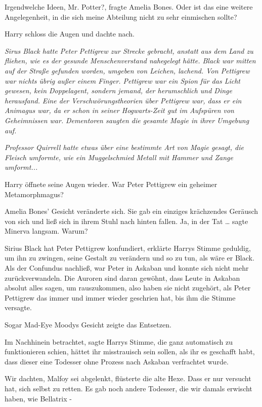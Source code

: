 \glqq{}Irgendwelche Ideen, Mr. Potter?\grqq{}, fragte Amelia Bones. \glqq{}Oder
ist das eine weitere Angelegenheit, in die sich meine Abteilung nicht zu sehr
einmischen sollte?\grqq{}

Harry schloss die Augen und dachte nach.

\emph{Sirus Black hatte Peter Pettigrew zur Strecke gebracht, anstatt aus dem
Land zu fliehen, wie es der gesunde Menschenverstand nahegelegt hätte. Black war
mitten auf der Straße gefunden worden, umgeben von Leichen, lachend. Von
Pettigrew war nichts übrig außer einem Finger. Pettigrew war ein Spion für das
Licht gewesen, kein Doppelagent, sondern jemand, der herumschlich und Dinge
herausfand.} \emph{ Eine der Verschwörungstheorien über Pettigrew war, dass er
ein Animagus war, da er schon in seiner Hogwarts-Zeit gut im Aufspüren von
Geheimnissen war.} \emph{ Dementoren saugten die gesamte Magie in ihrer Umgebung
auf.}

\emph{Professor Quirrell hatte etwas über eine bestimmte Art von Magie gesagt,
die Fleisch umformte, wie ein Muggelschmied Metall mit Hammer und Zange
umformt...}

Harry öffnete seine Augen wieder. \glqq{}War Peter Pettigrew ein geheimer
Metamorphmagus?\grqq{}

Amelia Bones' Gesicht veränderte sich. Sie gab ein einziges krächzendes Geräusch
von sich und ließ sich in ihrem Stuhl nach hinten fallen. \glqq{}Ja, in der Tat
…\grqq{} sagte Minerva langsam. \glqq{}Warum?\grqq{}

\glqq{}Sirius Black hat Peter Pettigrew konfundiert\grqq{}, erklärte Harrys
Stimme geduldig, \glqq{}um ihn zu zwingen, seine Gestalt zu verändern und so zu
tun, als wäre er Black. Als der Confundus nachließ, war Peter in Askaban und
konnte sich nicht mehr zurückverwandeln. Die Auroren sind daran gewöhnt, dass
Leute in Askaban absolut alles sagen, um rauszukommen, also haben sie nicht
zugehört, als Peter Pettigrew das immer und immer wieder geschrien hat, bis ihm
die Stimme versagte.\grqq{}

Sogar Mad-Eye Moodys Gesicht zeigte das Entsetzen.

\glqq{}Im Nachhinein betrachtet\grqq{}, sagte Harrys Stimme, die ganz automatisch
zu funktionieren schien, \glqq{}hättet ihr misstrauisch sein sollen, als ihr es
geschafft habt, dass dieser eine Todesser ohne Prozess nach Askaban verfrachtet
wurde.\grqq{}

\glqq{}Wir dachten, Malfoy sei abgelenkt\grqq{}, flüsterte die alte Hexe. \glqq{}
Dass er nur versucht hat, sich selbst zu retten. Es gab noch andere Todesser,
die wir damals erwischt haben, wie Bellatrix -\grqq{}

